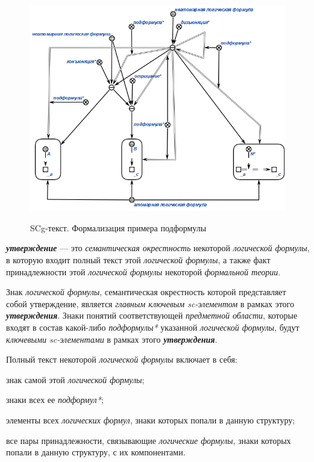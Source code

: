 \begin{SCn}
\end{SCn}

\begin{figure}[H]
	\caption{SCg-текст. Формализация примера подформулы}
	\includegraphics[scale=0.8]{author/part2/figures/logic/subformula.png}
	\label{fig:modus_ponens}
\end{figure}

\textbf{\textit{утверждение}} --- это \textit{семантическая окрестность} некоторой \textit{логической формулы}, в которую входит полный текст этой \textit{логической формулы}, а также факт принадлежности этой \textit{логической формулы} некоторой \textit{формальной теории}.

Знак \textit{логической формулы}, семантическая окрестность которой представляет собой утверждение, является \textit{главным ключевым sc-элементом\scnrolesign} в рамках этого \textbf{\textit{утверждения}}. Знаки понятий соответствующей \textit{предметной области}, которые входят в состав какой-либо \textit{подформулы*} указанной \textit{логической формулы}, будут \textit{ключевыми sc-элементами\scnrolesign} в рамках этого \textbf{\textit{утверждения}}.
	
Полный текст некоторой \textit{логической формулы} включает в себя:
\begin{textitemize}
	\item{знак самой этой \textit{логической формулы}};
	\item{знаки всех ее \textit{подформул*}};
	\item{элементы всех \textit{логических формул}, знаки которых попали в данную структуру;}
	\item{все пары принадлежности, связывающие \textit{логические формулы}, знаки которых попали в данную структуру, с их компонентами.}
\end{textitemize}

